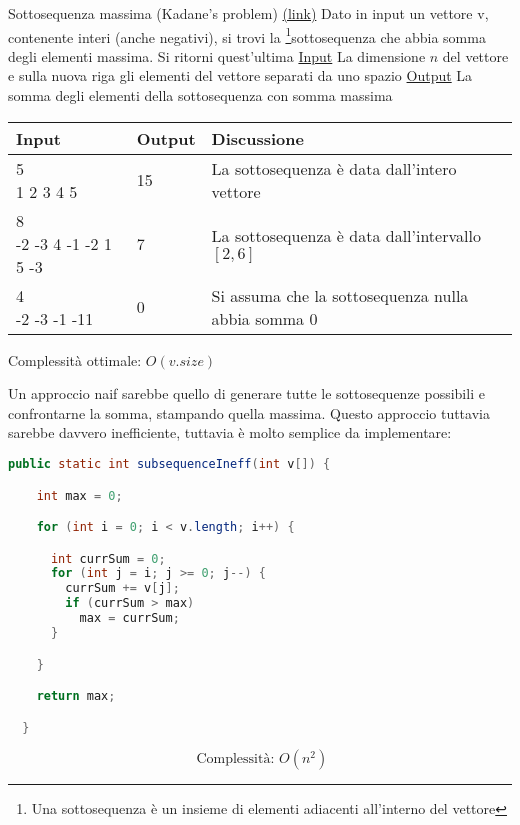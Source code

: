 \begin{esercizio}{Sottosequenza massima (Kadane's problem) \href{https://leetcode.com/problems/maximum-subarray}{(link)} }
	Dato in input un vettore {\ttfamily v}, contenente interi (anche negativi), si trovi la \footnote{Una sottosequenza è un insieme di elementi adiacenti all'interno del vettore}{sottosequenza} che abbia somma degli elementi massima. Si ritorni quest'ultima
	\vskip3mm
	\vskip3mm
	\underline{Input}
	\vskip3mm
	La dimensione $ n $ del vettore e sulla nuova riga gli elementi del vettore separati da uno spazio
	\vskip3mm
	\underline{Output}
	\vskip3mm
	La somma degli elementi della sottosequenza con somma massima
	\begin{center}
		\begin{tabularx}{\textwidth}{llX}
			\toprule
			Input & Output & Discussione \\
			\midrule
			\makecell{5                  \\ 1 2 3 4 5} & 15 & La sottosequenza è data dall'intero vettore \\
			\makecell{8                  \\ -2 -3 4 -1 -2 1 5 -3} & 7 & La sottosequenza è data dall'intervallo $ \left[2, 6\right] $ \\
			\makecell{4                  \\ -2 -3 -1 -11 } & 0 & Si assuma che la sottosequenza nulla abbia somma 0  \\
			\bottomrule
		\end{tabularx}
	\end{center}
	Complessità ottimale: $ O\left(v.size\right) $
\end{esercizio}
\vskip3mm

Un approccio naif sarebbe quello di generare tutte le sottosequenze possibili e confrontarne la somma, stampando quella massima. Questo approccio tuttavia sarebbe davvero inefficiente, tuttavia è molto semplice da implementare:
\begin{lstlisting}[language = java, frame = none]
    public static int subsequenceIneff(int v[]) {

    int max = 0;

    for (int i = 0; i < v.length; i++) {

      int currSum = 0;
      for (int j = i; j >= 0; j--) {
        currSum += v[j];
        if (currSum > max)
          max = currSum;
      }

    }

    return max;

  }
\end{lstlisting}
\[
	\text{ Complessità: } O\left(n^2 \right)
\]

